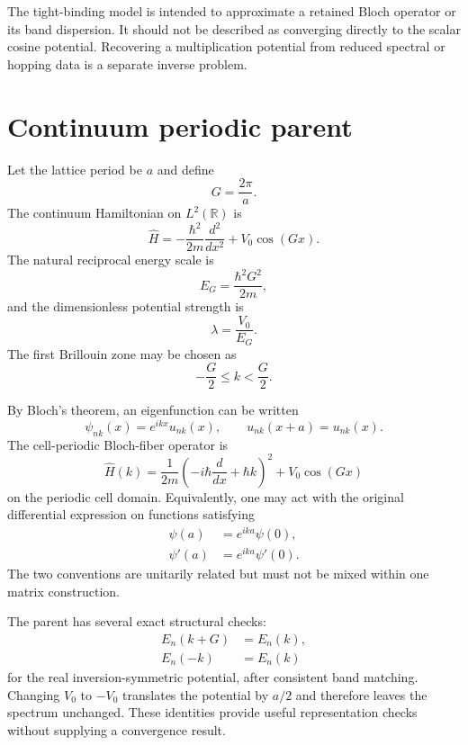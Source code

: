 The tight-binding model is intended to approximate a retained Bloch operator or
its band dispersion. It should not be described as converging directly to the
scalar cosine potential. Recovering a multiplication potential from reduced
spectral or hopping data is a separate inverse problem.

\section*{Continuum periodic parent}

Let the lattice period be $a$ and define
\begin{equation}
    G=\frac{2\pi}{a}.
\end{equation}
The continuum Hamiltonian on $L^2(\mathbb R)$ is
\begin{equation}
    \hat H
    =
    -\frac{\hbar^2}{2m}\frac{d^2}{dx^2}
    +
    V_0\cos(Gx).
\end{equation}
The natural reciprocal energy scale is
\begin{equation}
    E_G
    =
    \frac{\hbar^2G^2}{2m},
\end{equation}
and the dimensionless potential strength is
\begin{equation}
    \lambda=\frac{V_0}{E_G}.
\end{equation}
The first Brillouin zone may be chosen as
\begin{equation}
    -\frac{G}{2}
    \leq k<\frac{G}{2}.
\end{equation}

By Bloch's theorem, an eigenfunction can be written
\begin{equation}
    \psi_{nk}(x)
    =
    e^{ikx}u_{nk}(x),
    \qquad
    u_{nk}(x+a)=u_{nk}(x).
\end{equation}
The cell-periodic Bloch-fiber operator is
\begin{equation}
    \hat H(k)
    =
    \frac{1}{2m}
    \left(-i\hbar\frac{d}{dx}+\hbar k\right)^2
    +
    V_0\cos(Gx)
\end{equation}
on the periodic cell domain. Equivalently, one may act with the original
differential expression on functions satisfying
\begin{align}
    \psi(a)&=e^{ika}\psi(0),
    \\
    \psi'(a)&=e^{ika}\psi'(0).
\end{align}
The two conventions are unitarily related but must not be mixed within one
matrix construction.

The parent has several exact structural checks:
\begin{align}
    E_n(k+G)&=E_n(k),
    \\
    E_n(-k)&=E_n(k)
\end{align}
for the real inversion-symmetric potential, after consistent band matching.
Changing $V_0$ to $-V_0$ translates the potential by $a/2$ and therefore leaves
the spectrum unchanged. These identities provide useful representation checks
without supplying a convergence result.


